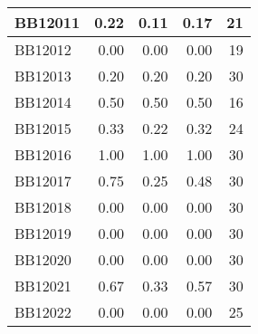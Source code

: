 \begin{longtable}{|l|r|r|r||r|}
	\hline
	BB12011 & \cellcolor[rgb]{ .988,  1,  .992}0.22 & \cellcolor[rgb]{ .384,  .745,  .478}0.11 & \cellcolor[rgb]{ .698,  .878,  .745}0.17 & \cellcolor[rgb]{ .98,  .588,  .596}21 \\
	\hline
	BB12012 & \cellcolor[rgb]{ .988,  1,  .992}0.00 & \cellcolor[rgb]{ .988,  1,  .992}0.00 & \cellcolor[rgb]{ .988,  1,  .992}0.00 & \cellcolor[rgb]{ .98,  .624,  .635}19 \\
	\hline
	BB12013 & \cellcolor[rgb]{ .988,  1,  .992}0.20 & \cellcolor[rgb]{ .988,  1,  .992}0.20 & \cellcolor[rgb]{ .988,  1,  .992}0.20 & \cellcolor[rgb]{ .973,  .412,  .42}30 \\
	\hline
	BB12014 & \cellcolor[rgb]{ .988,  1,  .992}0.50 & \cellcolor[rgb]{ .988,  1,  .992}0.50 & \cellcolor[rgb]{ .988,  1,  .992}0.50 & \cellcolor[rgb]{ .98,  .682,  .694}16 \\
	\hline
	BB12015 & \cellcolor[rgb]{ .988,  1,  .992}0.33 & \cellcolor[rgb]{ .384,  .745,  .478}0.22 & \cellcolor[rgb]{ .91,  .965,  .925}0.32 & \cellcolor[rgb]{ .976,  .529,  .537}24 \\
	\hline
	BB12016 & \cellcolor[rgb]{ .988,  1,  .992}1.00 & \cellcolor[rgb]{ .988,  1,  .992}1.00 & \cellcolor[rgb]{ .988,  1,  .992}1.00 & \cellcolor[rgb]{ .973,  .412,  .42}30 \\
	\hline
	BB12017 & \cellcolor[rgb]{ .988,  1,  .992}0.75 & \cellcolor[rgb]{ .384,  .745,  .478}0.25 & \cellcolor[rgb]{ .663,  .863,  .718}0.48 & \cellcolor[rgb]{ .973,  .412,  .42}30 \\
	\hline
	BB12018 & \cellcolor[rgb]{ .988,  1,  .992}0.00 & \cellcolor[rgb]{ .988,  1,  .992}0.00 & \cellcolor[rgb]{ .988,  1,  .992}0.00 & \cellcolor[rgb]{ .973,  .412,  .42}30 \\
	\hline
	BB12019 & \cellcolor[rgb]{ .988,  1,  .992}0.00 & \cellcolor[rgb]{ .988,  1,  .992}0.00 & \cellcolor[rgb]{ .988,  1,  .992}0.00 & \cellcolor[rgb]{ .973,  .412,  .42}30 \\
	\hline
	BB12020 & \cellcolor[rgb]{ .988,  1,  .992}0.00 & \cellcolor[rgb]{ .988,  1,  .992}0.00 & \cellcolor[rgb]{ .988,  1,  .992}0.00 & \cellcolor[rgb]{ .973,  .412,  .42}30 \\
	\hline
	BB12021 & \cellcolor[rgb]{ .988,  1,  .992}0.67 & \cellcolor[rgb]{ .384,  .745,  .478}0.33 & \cellcolor[rgb]{ .804,  .922,  .835}0.57 & \cellcolor[rgb]{ .973,  .412,  .42}30 \\
	\hline
	BB12022 & \cellcolor[rgb]{ .988,  1,  .992}0.00 & \cellcolor[rgb]{ .988,  1,  .992}0.00 & \cellcolor[rgb]{ .988,  1,  .992}0.00 & \cellcolor[rgb]{ .976,  .51,  .518}25 \\

\end{longtable}
